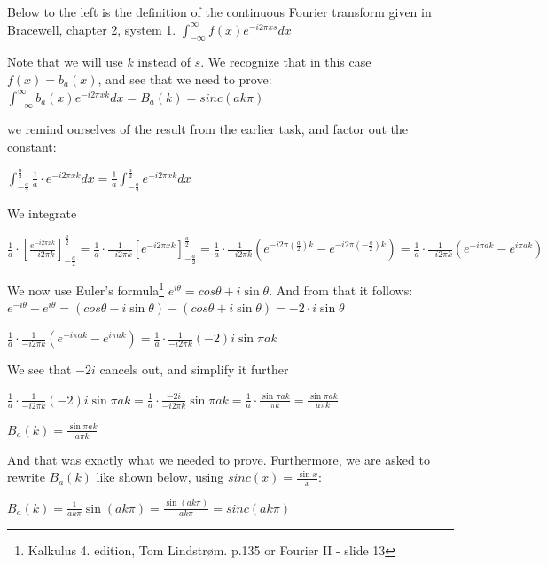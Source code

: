 \documentclass[12pt]{article} %
\begin{document}
Below to the left is the definition of the continuous Fourier transform given in Bracewell, chapter 2, system 1.
$ \int_{- \infty}^{\infty} f(x) e^{-i2\pi x s} dx$

Note that we will use $k$ instead of $s$. We recognize that in this case $f(x) = b_a (x)$, and see that we need to prove:
$ \int_{- \infty}^{\infty} b_a(x) e^{-i2\pi x k} dx =
B_a(k)= sinc(ak\pi)$

we remind ourselves of the result from the earlier task, and factor out the constant:

$ \int_{-\frac{a}{2}}^{\frac{a}{2}} \frac{1}{a} \cdot e^{-i2\pi x k} dx
=
 \frac{1}{a} \int_{-\frac{a}{2}}^{\frac{a}{2}} e^{-i2\pi x k} dx$

 We integrate

 $\frac{1}{a} \cdot \left[ \frac{e^{-i2\pi x k}}{-i2\pi k} \right]^{\frac{a}{2}}_{-\frac{a}{2}}
 =
 \frac{1}{a} \cdot \frac{1}{-i2\pi k} \left[e^{-i2\pi x k} \right]^{\frac{a}{2}}_{-\frac{a}{2}}
 =
  \frac{1}{a} \cdot \frac{1}{-i2\pi k} \left(e^{-i2\pi (\frac{a}{2}) k} -e^{-i2\pi (-\frac{a}{2}) k}  \right)
  =
  \frac{1}{a} \cdot \frac{1}{-i2\pi k} \left(e^{-i\pi a k} -e^{i\pi a k}  \right)$

  We now use Euler's formula\footnote{Kalkulus 4. edition, Tom Lindstr{\o}m. p.135  or Fourier II - slide 13} $e^{i\theta} =cos \theta + i \sin \theta$. And from that it follows: $e^{-i\theta} -e^{i\theta} =(cos \theta - i \sin \theta) - (cos \theta +i \sin \theta) =- 2 \cdot i \sin \theta$

  $\frac{1}{a} \cdot \frac{1}{-i2\pi k} \left(e^{-i\pi a k} -e^{i\pi a k}  \right)=
  \frac{1}{a} \cdot \frac{1}{-i2\pi k} (-2) i\sin  \pi a  k$

We see that $-2 i$ cancels out, and simplify it further

$
\frac{1}{a} \cdot \frac{1}{-i2\pi k} (-2) i\sin  \pi a  k
=
\frac{1}{a} \cdot \frac{-2 i}{-i2\pi k} \sin  \pi a  k
=
\frac{1}{a} \cdot \frac{\sin  \pi a  k}{\pi k}
=
 \frac{\sin  \pi a  k}{a \pi k}
$

$ B_a(k)=\frac{\sin  \pi a  k}{a \pi k} $


And that was exactly what we needed to prove. Furthermore, we are asked to rewrite $B_a(k)$ like shown below, using $sinc(x)=\frac{\sin x}{x}$:

$B_a(k)= \frac{1}{ak\pi} \sin(ak\pi)=
\frac{\sin(ak\pi)}{ak\pi} = sinc(ak\pi) $


\pagebreak
\end{document}
